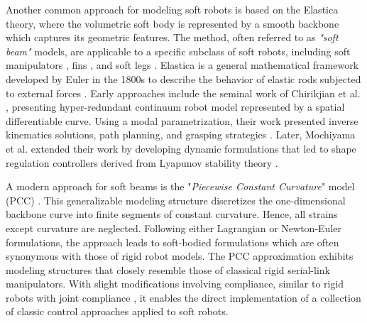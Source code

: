 Another common approach for modeling soft robots is based on the Elastica theory, where the volumetric soft body is represented by a smooth backbone which captures its geometric features. The method, often referred to as \emph{"soft beam"} models, are applicable to a specific subclass of soft robots, including soft manipulators \cite{Falkenhahn2015,Marchese2016,Jones2006,Webster2010}, fins \cite{Katzschmann2019,Marchese2014}, and soft legs \cite{Drotman2021Feb,vanLaake2022Sep}. Elastica is a general mathematical framework developed by Euler in the 1800s to describe the behavior of elastic rods subjected to external forces \cite{Levien2008,Antman2005}. Early approaches include the seminal work of Chirikjian et al. \cite{Chirikjian1989,Chirikjian1991,Chirikjian1992}, presenting hyper-redundant continuum robot model represented by a spatial differentiable curve. Using a modal parametrization, their work presented inverse kinematics solutions, path planning, and grasping strategies \cite{Chirikjian1992}. Later, Mochiyama et al. \cite{Mochiyama1992,Mochiyama1999} extended their work by developing dynamic formulations that led to shape regulation controllers derived from Lyapunov stability theory \cite{Khalil2014Feb}. 

A modern approach for soft beams is the "\emph{Piecewise Constant Curvature}" model (PCC) \cite{Webster2010}. This generalizable modeling structure discretizes the one-dimensional backbone curve into finite segments of constant curvature. Hence, all strains except curvature are neglected. Following either Lagrangian or Newton-Euler formulations, the approach leads to soft-bodied formulations which are often synonymous with those of rigid robot models. The PCC approximation exhibits modeling structures that closely resemble those of classical rigid serial-link manipulators. With slight modifications involving compliance, similar to rigid robots with joint compliance \cite{DeLuca2016Jul,Lynch2017}, it enables the direct implementation of a collection of classic control approaches \cite{Katzschmann2018,DellaSantina2020,Franco2020,Franco2022May,Jones2006,Kazemipour2022May,Godage2015,Godage2016} applied to soft robots.

